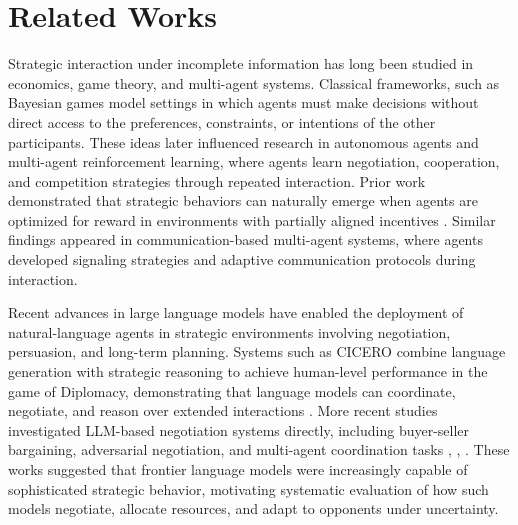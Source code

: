 \documentclass[conference]{IEEEtran}
\begin{document}
\section{Related Works}

Strategic interaction under incomplete information has long been studied in economics, game theory, and multi-agent systems. Classical frameworks, such as Bayesian games model settings in which agents must make decisions without direct access to the preferences, constraints, or intentions of the other participants. These ideas later influenced research in autonomous agents and multi-agent reinforcement learning, where agents learn negotiation, cooperation, and competition strategies through repeated interaction. Prior work demonstrated that strategic behaviors can naturally emerge when agents are optimized for reward in environments with partially aligned incentives \cite{Leibo}. Similar findings appeared in communication-based multi-agent systems, where agents developed signaling strategies and adaptive communication protocols during interaction.

Recent advances in large language models have enabled the deployment of natural-language agents in strategic environments involving negotiation, persuasion, and long-term planning. Systems such as CICERO combine language generation with strategic reasoning to achieve human-level performance in the game of Diplomacy, demonstrating that language models can coordinate, negotiate, and reason over extended interactions \cite{Cicero}. More recent studies investigated LLM-based negotiation systems directly, including buyer-seller bargaining, adversarial negotiation, and multi-agent coordination tasks \cite{Abdelnabi}, \cite{PieArena}, \cite{AgenticPay}. These works suggested that frontier language models were increasingly capable of sophisticated strategic behavior, motivating systematic evaluation of how such models negotiate, allocate resources, and adapt to opponents under uncertainty.
\end{document}
